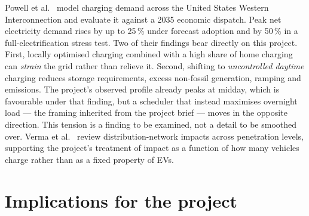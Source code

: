 \documentclass[11pt,a4paper]{article}
\begin{document}
Powell et al.~\cite{Powell2022ChargingInfrastructureGridImpacts} model charging demand across the
United States Western Interconnection and evaluate it against a 2035 economic dispatch. Peak net
electricity demand rises by up to 25\,\% under forecast adoption and by 50\,\% in a
full-electrification stress test. Two of their findings bear directly on this project. First,
locally optimised charging combined with a high share of home charging can \emph{strain} the grid
rather than relieve it. Second, shifting to \emph{uncontrolled daytime} charging reduces storage
requirements, excess non-fossil generation, ramping and emissions. The project's observed profile
already peaks at midday, which is favourable under that finding, but a scheduler that instead
maximises overnight load --- the framing inherited from the project brief --- moves in the opposite
direction. This tension is a finding to be examined, not a detail to be smoothed over.
Verma et al.~\cite{Verma2021ReviewImpactsDistributionNetwork} review distribution-network impacts
across penetration levels, supporting the project's treatment of impact as a function of how many
vehicles charge rather than as a fixed property of EVs.

\section{Implications for the project}\label{sec:implications}
\end{document}
